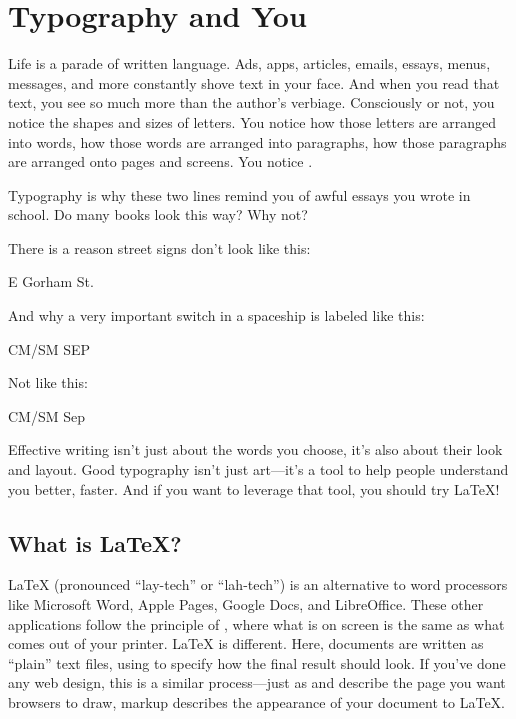 \chapter{Typography and You}
\label{typography}

Life is a parade of written language.
Ads, apps, articles, emails, essays, menus, messages, and more
constantly shove text in your face.
And when you read that text, you see so much more than the author's
verbiage.
Consciously or not, you notice the shapes and sizes of letters.
You notice how those letters are arranged into words,
how those words are arranged into paragraphs,
how those paragraphs are arranged onto pages and screens.
You notice .
\begin{leftfigure}
\fontsize{12bp}{24bp}\selectfont\raggedright
Typography is why these two lines remind you of awful essays
you wrote in school.
Do many books look this way? Why not?
\end{leftfigure}
\medskip
\noindent There is a reason street signs don't look like this:
\begin{leftfigure}
\Large E Gorham St.
\end{leftfigure}
And why a very important switch in a spaceship is labeled like this:
\begin{leftfigure}
CM/SM SEP
\end{leftfigure}
Not like this:
\begin{leftfigure}
\Large CM/SM Sep
\end{leftfigure}
Effective writing isn't just about the words you choose,
it's also about their look and layout.
Good typography isn't just art---it's a tool to help people understand you
better, faster.
And if you want to leverage that tool, you should try \LaTeX!
\clearpage

\section{What is \texorpdfstring{\LaTeX}{LaTeX}?}

\LaTeX{} (pronounced ``lay-tech'' or ``lah-tech'') is an
alternative to word processors like Microsoft Word,
Apple Pages, Google Docs, and LibreOffice.
These other applications follow the principle of
, where what is on screen is the same
as what comes out of your printer.
\LaTeX{} is different. Here, documents are written as
``plain'' text files, using 
to specify how the final result should look.
If you've done any web design, this is a similar
process---just as  and 
describe the page you want browsers to draw,
markup describes the appearance of your document to \LaTeX.

